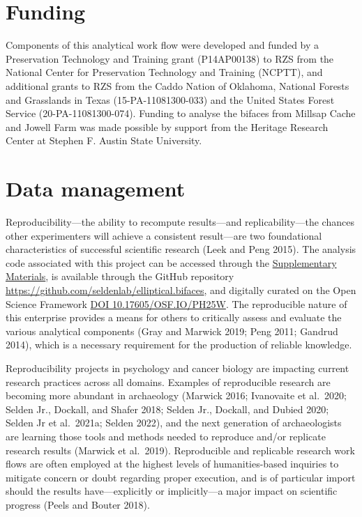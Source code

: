 \documentclass[]{interact}
\theoremstyle{plain}%
\theoremstyle{definition}
\theoremstyle{remark}
\begin{document}
\hypertarget{funding}{%
\section*{Funding}\label{funding}}

Components of this analytical work flow were developed and funded by a
Preservation Technology and Training grant (P14AP00138) to RZS from the
National Center for Preservation Technology and Training (NCPTT), and
additional grants to RZS from the Caddo Nation of Oklahoma, National
Forests and Grasslands in Texas (15-PA-11081300-033) and the United
States Forest Service (20-PA-11081300-074). Funding to analyse the
bifaces from Millsap Cache and Jowell Farm was made possible by support
from the Heritage Research Center at Stephen F. Austin State University.

\hypertarget{data-management}{%
\section{Data management}\label{data-management}}

Reproducibility---the ability to recompute results---and
replicability---the chances other experimenters will achieve a
consistent result---are two foundational characteristics of successful
scientific research (Leek and Peng 2015). The analysis code associated
with this project can be accessed through the
\href{https://seldenlab.github.io/elliptical.bifaces/}{Supplementary
Materials}, is available through the GitHub repository
\url{https://github.com/seldenlab/elliptical.bifaces}, and digitally
curated on the Open Science Framework \href{https://osf.io/ph25w/}{DOI
10.17605/OSF.IO/PH25W}. The reproducible nature of this enterprise
provides a means for others to critically assess and evaluate the
various analytical components (Gray and Marwick 2019; Peng 2011; Gandrud
2014), which is a necessary requirement for the production of reliable
knowledge.

Reproducibility projects in psychology and cancer biology are impacting
current research practices across all domains. Examples of reproducible
research are becoming more abundant in archaeology (Marwick 2016;
Ivanovaite et al.~2020; Selden Jr., Dockall, and Shafer 2018; Selden
Jr., Dockall, and Dubied 2020; Selden Jr et al.~2021a; Selden 2022), and
the next generation of archaeologists are learning those tools and
methods needed to reproduce and/or replicate research results (Marwick
et al.~2019). Reproducible and replicable research work flows are often
employed at the highest levels of humanities-based inquiries to mitigate
concern or doubt regarding proper execution, and is of particular import
should the results have---explicitly or implicitly---a major impact on
scientific progress (Peels and Bouter 2018).






\end{document}
